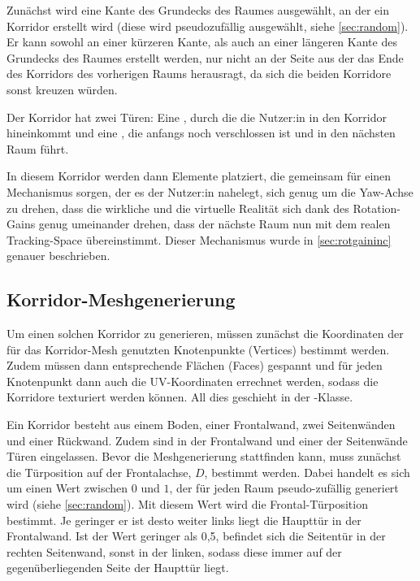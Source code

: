 Zunächst wird eine Kante des Grundecks des Raumes ausgewählt, an der ein Korridor erstellt wird (diese wird pseudozufällig ausgewählt, siehe \autoref{sec:random}). Er kann sowohl an einer kürzeren Kante, als auch an einer längeren Kante des Grundecks des Raumes erstellt werden, nur nicht an der Seite aus der das Ende des Korridors des vorherigen Raums herausragt, da sich die beiden Korridore sonst kreuzen würden.

Der Korridor hat zwei Türen: Eine , durch die die Nutzer:in in den Korridor hineinkommt und eine , die anfangs noch verschlossen ist und in den nächsten Raum führt. %

In diesem Korridor werden dann Elemente platziert, die gemeinsam für einen Mechanismus sorgen, der es der Nutzer:in nahelegt, sich genug um die Yaw-Achse zu drehen, dass die wirkliche und die virtuelle Realität sich dank des Rotation-Gains genug umeinander drehen, dass der nächste Raum nun mit dem realen Tracking-Space übereinstimmt. Dieser Mechanismus wurde in
\autoref{sec:rotgaininc}
genauer beschrieben.

\subsection{Korridor-Meshgenerierung}
\label{subsec:corridormesh}
Um einen solchen Korridor zu generieren, müssen zunächst die Koordinaten der  für das Korridor-Mesh genutzten Knotenpunkte (Vertices) bestimmt werden. Zudem müssen dann entsprechende Flächen (Faces) gespannt und für jeden Knotenpunkt dann auch die UV-Koordinaten errechnet werden, sodass die Korridore texturiert werden können. All dies geschieht in der -Klasse.

Ein Korridor besteht aus einem Boden, einer Frontalwand, zwei Seitenwänden und einer Rückwand. Zudem sind in der Frontalwand und einer der Seitenwände Türen eingelassen.
Bevor die Meshgenerierung stattfinden kann, muss zunächst die Türposition auf der Frontalachse, $D$, bestimmt werden. Dabei handelt es sich um einen Wert zwischen $0$ und $1$, der für jeden Raum pseudo-zufällig generiert wird (siehe \autoref{sec:random}). Mit diesem Wert wird die Frontal-Türposition bestimmt. Je geringer er ist desto weiter links liegt die Haupttür in der Frontalwand. Ist der Wert geringer als 0,5, befindet sich die Seitentür in der rechten Seitenwand, sonst in der linken, sodass diese immer auf der gegenüberliegenden Seite der Haupttür liegt.

